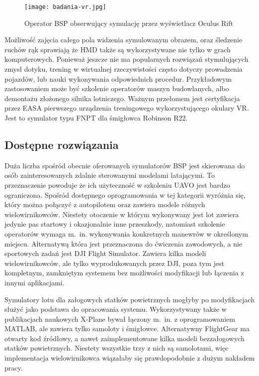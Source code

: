 \begin{figure}[!h]
    \centering \texttt{[image: badania-vr.jpg]}
    \caption{Operator BSP obserwujący symulację przez wyświetlacz Oculus Rift}
    \label{fig:badania-vr}
\end{figure}

Możliwość zajęcia całego pola widzenia symulowanym obrazem, oraz śledzenie ruchów rąk sprawiają że HMD także są wykorzystywane nie tylko w grach komputerowych. Ponieważ jeszcze nie ma popularnych rozwiązań stymulujących zmysł dotyku, trening w wirtualnej rzeczywistości często dotyczy prowadzenia pojazdów, lub nauki wykonywania odpowiednich procedur. Przykładowym zastosowaniem może być szkolenie operatorów maszyn budowlanych\cite{cmlabs2021}, albo demontażu złożonego silnika lotniczego\cite{inlusion2020}. Ważnym przełomem jest certyfikacja przez EASA pierwszego urządzenia treningowego wykorzystującego okulary VR\cite{easavr2021}. Jest to symulator typu FNPT dla śmigłowca Robinson R22.

\subsection{Dostępne rozwiązania}
Duża liczba spośród obecnie oferowanych symulatorów BSP jest skierowana do osób zainteresowanych zdalnie sterowanymi modelami latającymi. To przeznaczenie powoduje że ich użyteczność w szkoleniu UAVO jest bardzo ograniczona. Spośród dostępnego oprogramowania w tej kategorii wyróżnia się\cite{realflight}, który można połączyć z autopilotem oraz zawiera modele różnych wielowirnikowców. Niestety otoczenie w którym wykonywany jest lot zawiera jedynie pas startowy i okazjonalnie inne przeszkody, natomiast szkolenie operatorów wymaga m.~in. wykonywania konkretnych manewrów w określonym miejscu. Alternatywą która jest przeznaczona do ćwiczenia zawodowych, a nie sportowych zadań jest DJI Flight Simulator\cite{djifs}. Zawiera kilka modeli wielowirnikowców, ale tylko wyprodukowanych przez DJI, poza tym jest kompletnym, zamkniętym systemem bez możliwości modyfikacji lub łączenia z innymi aplikacjami.

Symulatory lotu dla załogowych statków powietrznych mogłyby po modyfikacjach służyć jako podstawa do opracowania systemu. Wykorzystywany także w publikacjach naukowych X-Plane\cite{xplane} bywał łączony m.~in. z oprogramowaniem MATLAB, ale zawiera tylko samoloty i śmigłowce. Alternatywny FlightGear\cite{flightgear} ma otwarty kod źródłowy, a nawet zaimplementowane kilka modeli bezzałogowych statków powietrznych. Niestety wszystkie trzy z nich są samolotami, więc implementacja wielowirnikowca wiązałaby się prawdopodobnie z dużym nakładem pracy.


